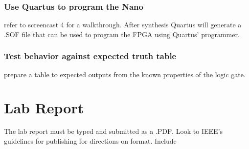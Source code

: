 \documentclass[12pt,journal]{IEEEtran}
\begin{document}
      \subsubsection{Use Quartus to program the Nano} refer to screencast 4 for a walkthrough. After synthesis
      Quartus will generate a .SOF file that can be used to program the FPGA using Quartus' programmer.
      \subsubsection{Test behavior against expected truth table} prepare a table to expected outputs
      from the known properties of the logic gate.

  \section{\bfseries  Lab Report}
    The lab report must be typed and submitted as a .PDF. Look to IEEE's guidelines for publishing for directions
    on format. Include
\end{document}
